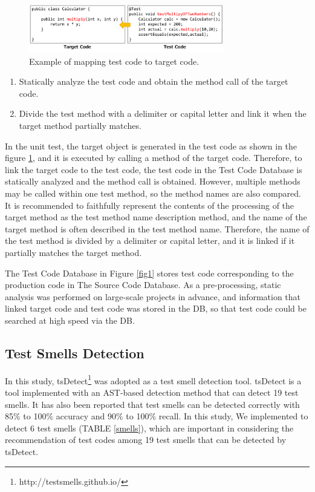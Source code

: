 \documentclass[conference]{IEEEtran}
\begin{document}
\begin{figure}[htbp]
\centerline{\includegraphics[width=8.5cm]{mapping.pdf}}
\caption{Example of mapping test code to target code.}
\label{fig2}
\end{figure}

\begin{enumerate}
\renewcommand{\labelenumi}{(\arabic{enumi})}
\item Statically analyze the test code and obtain the method call of the target code.
\item Divide the test method with a delimiter or capital letter and link it when the target method partially matches.
\end{enumerate}

In the unit test, the target object is generated in the test code as shown in the figure \ref{fig2}, and it is executed by calling a method of the target code. Therefore, to link the target code to the test code, the test code in the Test Code Database is statically analyzed and the method call is obtained. However, multiple methods may be called within one test method, so the method names are also compared. It is recommended to faithfully represent the contents of the processing of the target method as the test method name description method, and the name of the target method is often described in the test method name\cite{b22}. Therefore, the name of the test method is divided by a delimiter or capital letter, and it is linked if it partially matches the target method.

The Test Code Database in Figure \ref{fig1} stores test code corresponding to the production code in The Source Code Database. As a pre-processing, static analysis was performed on large-scale projects in advance, and information that linked target code and test code was stored in the DB, so that test code could be searched at high speed via the DB.

\subsection{Test Smells Detection}
In this study, tsDetect\footnote{http://testsmells.github.io/} was adopted as a test smell detection tool. tsDetect is a tool implemented with an AST-based detection method that can detect 19 test smells. It has also been reported that test smells can be detected correctly with 85\% to 100\% accuracy and 90\% to 100\% recall. In this study, We implemented to detect 6 test smells (TABLE \ref{smells}), which are important in considering the recommendation of test codes among 19 test smells that can be detected by tsDetect\cite{b9}.
\end{document}
